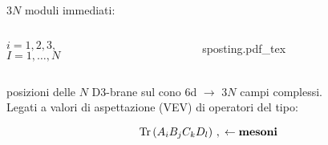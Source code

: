\documentclass[aspectratio=43,mathserif]{beamer}
\newcommand{\tr}{\operatorname{Tr}}
\begin{document}
\begin{frame}
	$3N$ moduli immediati:

	\begin{columns}
		\begin{column}{0.4\textwidth}
			\begin{center}	
				\scalebox{1.5}{$z_I^i$}		

				\vspace{10pt}
				$i=1,2,3,$\\ $I = 1,\ldots,N$
			\end{center}

		\end{column}
		\begin{column}{0.6\textwidth}

			\begin{figure}[h!]\centering
				\def\svgscale{0.9}
				{sposting.pdf_tex}
			\end{figure}

		\end{column}\end{columns}

	\vfill \vspace{-12pt}

	\vfill posizioni delle $N$ D3-brane sul cono 6d $\rightarrow$ $3N$ campi complessi.\\


	\vfill Legati a valori di aspettazione (VEV) di operatori del tipo:

	\begin{equation}
		\tr \left( A_i B_j C_k D_l \right)\,, \;\leftarrow \text{\textbf{mesoni}}
		\label{}
	\end{equation}



\end{frame}
\end{document}
